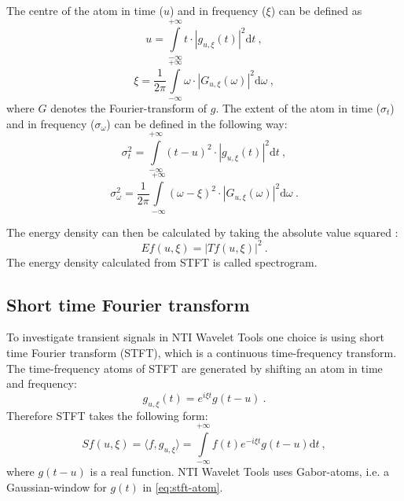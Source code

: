 \documentclass[a4paper,12pt,oneside]{article}
\newcommand{\dt}{\mathrm{d}t}
\newcommand{\dw}{\mathrm{d}\omega}
\begin{document}
The centre of the atom in time ($u$) and in frequency ($\xi$) can be defined as
	\begin{equation*}
	u = \int\limits_{-\infty}^{+\infty} t \cdot |g_{u, \xi}(t)|^2 \dt\ ,
	\end{equation*}
	\begin{equation*}
	\xi = \frac{1}{2\pi} \int\limits_{-\infty}^{+\infty} \omega \cdot |G_{u, \xi}(\omega)|^2 \dw\ ,
	\end{equation*}
where $G$ denotes the Fourier-transform of $g$. The extent of the atom in time ($\sigma_t$) and in frequency ($\sigma_{\omega}$) can be defined in the following way:
	\begin{equation*}
	\sigma_t^2 = \int\limits_{-\infty}^{+\infty} (t-u)^2 \cdot |g_{u, \xi}(t)|^2 \dt\ ,
	\end{equation*}
	\begin{equation*}
	\sigma_{\omega}^2 = \frac{1}{2\pi} \int\limits_{-\infty}^{+\infty} (\omega-\xi)^2 \cdot |G_{u, \xi}(\omega)|^2 \dw\ .
	\end{equation*}

The energy density can then be calculated by taking the absolute value squared \cite{mallat08wavelet}:
\begin{equation}\label{eq:energy_density}
  E f(u,\xi) = |T f(u,\xi)|^2\ .
\end{equation}
The energy density calculated from STFT is called spectrogram.

\subsection{Short time Fourier transform}

To investigate transient signals in NTI Wavelet Tools one choice is using short time Fourier transform\cite{mallat08wavelet} (STFT), which is a continuous time-frequency transform. The time-frequency atoms of STFT are generated by shifting an atom in time and frequency:
\begin{equation}\label{eq:stft-atom}
  g_{u,\xi}(t) = e^{i\xi t} g(t-u) \ .
\end{equation}
Therefore STFT takes the following form:
\begin{equation}\label{eq:stft}
  S f(u,\xi) = \langle f, g_{u, \xi} \rangle = \int\limits_{-\infty}^{+\infty} f(t) e^{-i \xi t} g(t-u) \dt \ ,
\end{equation}
where $g(t-u)$ is a real function. NTI Wavelet Tools uses Gabor-atoms, i.e. a Gaussian-window for $g(t)$ in \eqref{eq:stft-atom}.
\end{document}
